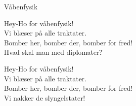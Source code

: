 \begin{song}{Våbenfysik}{}
  \begin{SBChorus}
	Hey-Ho for våbenfysik!\\
	Vi blæser på alle traktater.\\
	Bomber her, bomber der, bomber for fred!\\
	Hvad skal man med diplomater?
  \end{SBChorus}

  
  \begin{SBChorus}
	Hey-Ho for våbenfysik!\\
	Vi blæser på alle traktater.\\
	Bomber her, bomber der, bomber for fred!\\
	Vi nakker de slyngelstater!
  \end{SBChorus}

\end{song}